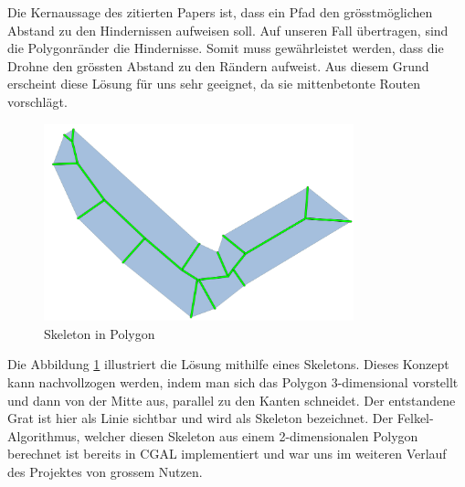 Die Kernaussage des zitierten Papers \cite[]{SkeletonUAV} ist, dass ein Pfad den grösstmöglichen Abstand zu den Hindernissen aufweisen soll. Auf unseren Fall übertragen, sind die Polygonränder die Hindernisse. Somit muss gewährleistet werden, dass die Drohne den grössten Abstand zu den Rändern aufweist. Aus diesem Grund erscheint diese Lösung für uns sehr geeignet, da sie mittenbetonte Routen vorschlägt. \\
\begin{figure}[H]
	\centering
	\includegraphics[width=0.8\textwidth]{images/routing/skeleton.png}
	\caption{Skeleton in Polygon}
	\label{fig:skeleton-in-polygon}
\end{figure}
Die Abbildung \ref{fig:skeleton-in-polygon} illustriert die Lösung mithilfe eines Skeletons. Dieses Konzept kann nachvollzogen werden, indem man sich das Polygon 3-dimensional vorstellt und dann  von der Mitte aus, parallel zu den Kanten schneidet. Der entstandene Grat ist hier als Linie sichtbar und wird als Skeleton bezeichnet. Der Felkel-Algorithmus, welcher diesen Skeleton aus einem 2-dimensionalen Polygon berechnet ist bereits in \Gls{CGAL} implementiert \cite{SkeletonCGAL} und war uns im weiteren Verlauf des Projektes von grossem Nutzen.\\






